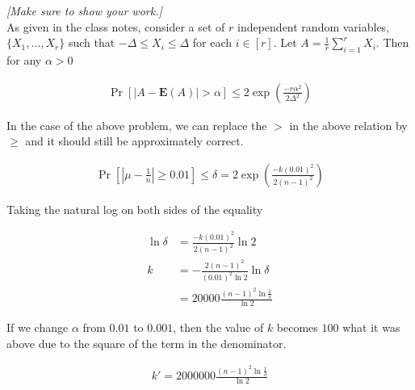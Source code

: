 \documentclass[11pt]{article}
\begin{document}
\emph{[Make sure to show your work.]}\\

As given in the class notes, consider a set of $r$ independent random variables, $\{X_1, \dots, X_r\}$ such that $-\Delta \leq X_i \leq \Delta$ for each $i \in [r]$. Let $A = \frac{1}{r}  \sum_{i=1}^r X_i$. Then for any $\alpha > 0$

\begin{equation*}
\begin{aligned}
\Pr[\left |A - \mathbf{E}(A)\right | > \alpha] \leq 2 \exp \left ( \frac{-r\alpha^2}{2 \Delta^2}\right )
\end{aligned}
\end{equation*}

In the case of the above problem, we can replace the $>$ in the above relation by $\geq$ and it should still be approximately correct.

\begin{equation*}
\begin{aligned}
\Pr[\left |\mu - \frac{1}{n}\right | \geq 0.01] \leq \delta = 2 \exp \left ( \frac{-k(0.01)^2}{2 (n-1)^2}\right )
\end{aligned}
\end{equation*}

Taking the natural log on both sides of the equality

\begin{equation*}
\begin{aligned}
\ln{\delta} &= \frac{-k(0.01)^2}{2 (n-1)^2} \ln{2}\\
k &= -\frac{2 (n-1)^2}{(0.01)^2 \ln{2}} \ln{\delta}\\
&= 20000\frac{ (n-1)^2 \ln{\frac{1}{\delta}}}{\ln{2}} 
\end{aligned}
\end{equation*}

If we change $\alpha$ from $0.01$ to $0.001$, then the value of $k$ becomes $100$ what it was above due to the square of the term in the denominator.

\begin{equation*}
\begin{aligned}
k'= 2000000\frac{ (n-1)^2 \ln{\frac{1}{\delta}}}{\ln{2}} 
\end{aligned}
\end{equation*}

 
\end{document}
